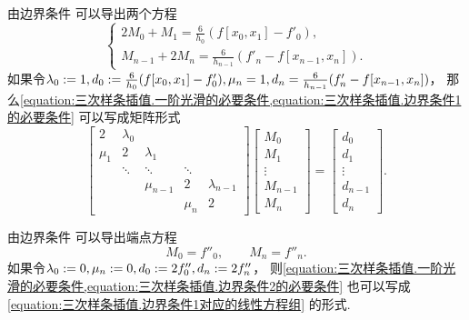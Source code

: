 由边界条件  可以导出两个方程\begin{equation}\label{equation:三次样条插值.边界条件1的必要条件}
	\begin{cases}
		2 M_0 + M_1 = \frac{6}{h_0} ( f[x_0,x_1] - f'_0 ), \\
		M_{n-1} + 2 M_n = \frac{6}{h_{n-1}} ( f'_n - f[x_{n-1},x_n] ).
	\end{cases}
\end{equation}
如果令\(
	\lambda_0 := 1,
	d_0 := \frac{6}{h_0} (f[x_0,x_1] - f'_0),
	\mu_n = 1,
	d_n = \frac{6}{h_{n-1}} (f'_n - f[x_{n-1},x_n])
\)，
那么\cref{equation:三次样条插值.一阶光滑的必要条件,equation:三次样条插值.边界条件1的必要条件}
可以写成矩阵形式\begin{equation}\label{equation:三次样条插值.边界条件1对应的线性方程组}
	\begin{bmatrix}
		2 & \lambda_0 \\
		\mu_1 & 2 & \lambda_1 \\
		& \ddots & \ddots & \ddots \\
		&& \mu_{n-1} & 2 & \lambda_{n-1} \\
		&&& \mu_n & 2
	\end{bmatrix}
	\begin{bmatrix}
		M_0 \\ M_1 \\ \vdots \\ M_{n-1} \\ M_n
	\end{bmatrix}
	= \begin{bmatrix}
		d_0 \\ d_1 \\ \vdots \\ d_{n-1} \\ d_n
	\end{bmatrix}.
\end{equation}

由边界条件  可以导出端点方程\begin{equation}\label{equation:三次样条插值.边界条件2的必要条件}
	M_0 = f''_0,
	\qquad
	M_n = f''_n.
\end{equation}
如果令\(
	\lambda_0 := 0,
	\mu_n := 0,
	d_0 := 2 f''_0,
	d_n := 2 f''_n
\)，
则\cref{equation:三次样条插值.一阶光滑的必要条件,equation:三次样条插值.边界条件2的必要条件}
也可以写成\cref{equation:三次样条插值.边界条件1对应的线性方程组} 的形式.

